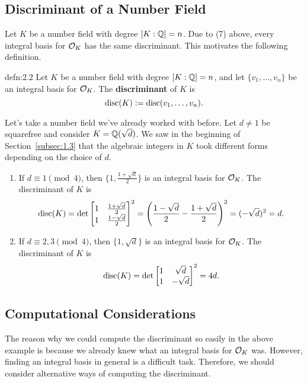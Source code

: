 \subsection{Discriminant of a Number Field}\label{subsec:2.2}
Let $K$ be a number field with degree $[K : \mathbb{Q}] = n$. 
Due to (7) above, every integral basis for ${\cal O}_K$ has the 
same discriminant. This motivates the following definition. 

\begin{defn}{defn:2.2}
    Let $K$ be a number field with degree $[K : \mathbb{Q}] = n$, and let 
    $\{v_1, \dots, v_n\}$ be an integral basis for ${\cal O}_K$. The
    {\bf discriminant} of $K$ is 
    \[ \operatorname{disc}(K) := \operatorname{disc}(v_1, \dots, v_n). \] 
\end{defn}

Let's take a number field we've already worked with before. Let $d \neq 1$ 
be squarefree and consider $K = \mathbb{Q}(\sqrt{d})$. We saw in the beginning 
of Section~\ref{subsec:1.3} that the algebraic integers in $K$ took 
different forms depending on the choice of $d$.
\begin{enumerate}[(1)]
    \item If $d \equiv 1 \pmod 4$, then $\{1, \frac{1+\sqrt{d}}2\}$ is an integral basis for ${\cal O}_K$. 
    The discriminant of $K$ is 
    \[ \operatorname{disc}(K) = \det\begin{bmatrix} 1 & \frac{1+\sqrt{d}}2 \\ 1 & \frac{1-\sqrt{d}}2 \end{bmatrix}^2 
    = \left(\frac{1-\sqrt{d}}2 - \frac{1+\sqrt{d}}2 \right)^2 = (-\sqrt{d})^2 = d. \]
    \item If $d \equiv 2, 3 \pmod 4$, then $\{1, \sqrt{d}\}$ is an integral basis 
    for ${\cal O}_K$. The discriminant of $K$ is 
    \[ \operatorname{disc}(K) = \det\begin{bmatrix} 1 & \sqrt{d} \\ 1 & -\sqrt{d} \end{bmatrix}^2 = 4d. \] 
\end{enumerate}

\subsection{Computational Considerations}\label{subsec:2.3}
The reason why we could compute the discriminant so easily in the above 
example is because we already knew what an integral basis for ${\cal O}_K$ 
was. However, finding an integral basis in general is a difficult task. 
Therefore, we should consider alternative ways of computing the discriminant. 


